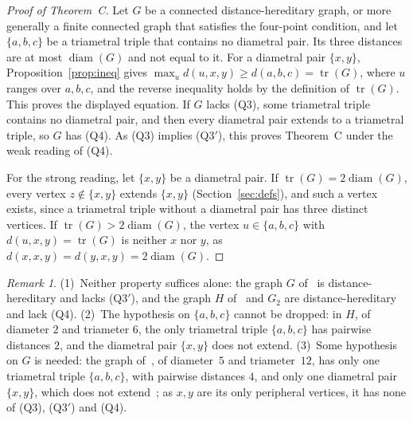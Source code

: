 \documentclass[11pt]{article}
\theoremstyle{remark}
\newtheorem{remark}[theorem]{Remark}
\DeclareMathOperator{\diam}{diam}
\DeclareMathOperator{\tr}{tr}
\newcommand{\QA}{\textup{(Q3)}}
\newcommand{\QAp}{\textup{(Q3$'$)}}
\newcommand{\QB}{\textup{(Q4)}}
\begin{document}
\begin{proof}[Proof of Theorem~C]
Let $G$ be a connected distance-hereditary graph, or more generally a finite
connected graph that satisfies the four-point condition, and let $\{a,b,c\}$ be
a triametral triple that contains no diametral pair. Its three distances are
at most $\diam(G)$ and not equal to it. For a diametral pair $\{x,y\}$,
Proposition~\ref{prop:ineq} gives $\max_ud(u,x,y)\ge d(a,b,c)=\tr(G)$, where $u$
ranges over $a,b,c$, and the reverse inequality holds by the definition of
$\tr(G)$. This proves the displayed equation. If $G$ lacks \QA, some triametral
triple contains no diametral pair, and then every diametral pair extends to a
triametral triple, so $G$ has \QB. As \QA{} implies \QAp, this proves
Theorem~C under the weak reading of \QB.

For the strong reading, let $\{x,y\}$ be a diametral pair. If
$\tr(G)=2\diam(G)$, every vertex $z\notin\{x,y\}$ extends $\{x,y\}$
(Section~\ref{sec:defs}), and such a vertex exists, since a triametral triple
without a diametral pair has three distinct vertices. If $\tr(G)>2\diam(G)$,
the vertex $u\in\{a,b,c\}$ with $d(u,x,y)=\tr(G)$ is neither $x$ nor $y$, as
$d(x,x,y)=d(y,x,y)=2\diam(G)$.
\end{proof}


\begin{remark}\label{rem:sharp}
(1)~Neither property suffices alone: the graph $G$ of~\cite[Figure~3]{hko} is
distance-hereditary and lacks \QAp, and the graph $H$ of~\cite[Figure~3]{hko}
and $G_2$ are distance-hereditary and lack \QB. (2)~The hypothesis on
$\{a,b,c\}$ cannot be dropped: in $H$, of diameter $2$ and triameter $6$, the
only triametral triple $\{a,b,c\}$ has pairwise distances $2$, and the
diametral pair $\{x,y\}$ does not extend. (3)~Some hypothesis on $G$ is
needed: the graph of~\cite[Figure~2]{hko}, of diameter~$5$ and triameter~$12$,
has only one triametral triple $\{a,b,c\}$, with pairwise distances $4$, and
only one diametral pair $\{x,y\}$, which does not
extend~\cite[Section~3.2]{hko}; as $x,y$ are its only peripheral vertices, it
has none of \QA, \QAp{} and \QB.
\end{remark}
\end{document}
